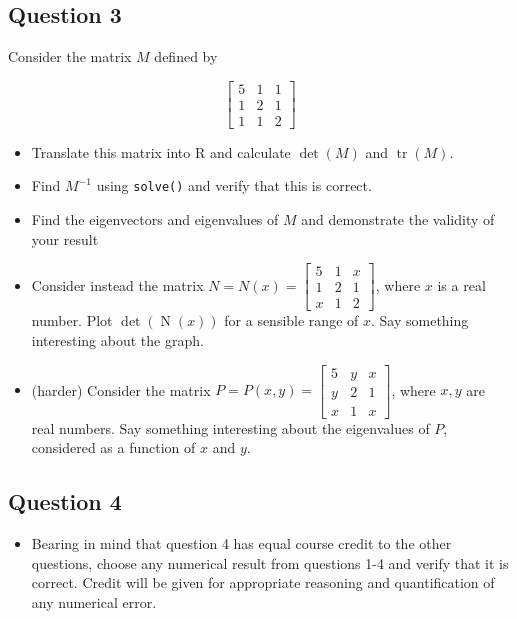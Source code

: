 \documentclass[nojss]{jss}\usepackage[]{graphicx}\usepackage[]{color}
\begin{document}
\subsection*{Question 3}
 
Consider the matrix $M$ defined by


\[
\begin{bmatrix}
  5&1&1\\
  1&2&1\\
  1&1&2
  \end{bmatrix}
\]


\begin{itemize}
\item Translate this matrix into R and calculate $\operatorname{det}\left(M\right)$ and $\operatorname{tr}\left(M\right)$. 
\item Find $M^{-1}$ using {\tt solve()} and verify that this is correct.
\item Find the eigenvectors and eigenvalues of $M$ and demonstrate the validity of your result
\item Consider instead the matrix $N=N(x)=\begin{bmatrix}
  5&1&x\\
  1&2&1\\
  x&1&2
  \end{bmatrix}$, where $x$ is a real number.  Plot $\operatorname{det}\left(\operatorname{N}(x)\right)$  for a sensible range of $x$.  Say something interesting about the graph.  
  \item  (harder) Consider the matrix $P=P(x,y)=\begin{bmatrix}
  5&y&x\\
  y&2&1\\
  x&1&x
  \end{bmatrix}$, where $x,y$ are real numbers.  Say something interesting about the eigenvalues of $P$, considered as a function of $x$ and $y$.
\end{itemize} 

\subsection*{Question 4}

\begin{itemize}
  \item 
    Bearing in mind that question 4 has equal course credit to the
    other questions, choose any numerical result from questions 1-4
    and verify that it is correct.  Credit will be given for
    appropriate reasoning and quantification of any numerical error.
    \end{itemize}


 
\end{document}
